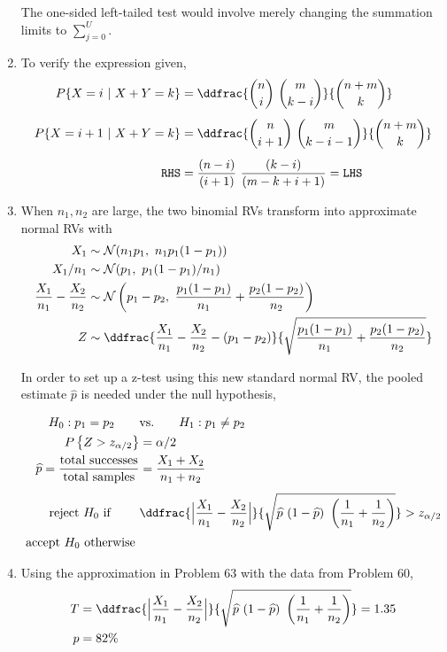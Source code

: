 \begin{enumerate}
	The one-sided left-tailed test would involve merely changing the summation limits to $ \sum\limits_{j = 0}^{U} $.
	
	\item To verify the expression given,
	\begin{align}
		P\{X = i\ |\ X+Y = k\} &= \ddfrac{\binom{n}{i}\ \binom{m}{k-i}}{\binom{n+m}{k}}  \\[1ex]
		P\{X = i+1\ |\ X+Y = k\} &= \ddfrac{\binom{n}{i+1}\ \binom{m}{k-i-1}}{\binom{n+m}{k}} \nonumber \\[1ex]
		\texttt{RHS} &= \frac{(n-i)}{(i+1)} \ \frac{(k-i)}{(m-k+i+1)} = \texttt{LHS}
	\end{align}

	\item When $ n_1, n_2 $ are large, the two binomial RVs transform into approximate normal RVs with
	\begin{align}
		X_1 &\sim \mathcal{N}(n_1 p_1,\ n_1 p_1 (1-p_1)) \nonumber \\
		X_1 / n_1 &\sim \mathcal{N}(p_1,\ p_1 (1-p_1) / n_1) \nonumber \\
		\frac{X_1}{n_1} - \frac{X_2}{n_2} &\sim \mathcal{N}\left( p_1 - p_2,\ \frac{p_1(1-p_1)}{n_1} + \frac{p_2(1-p_2)}{n_2} \right) \\
		Z &\sim \ddfrac{\frac{X_1}{n_1} - \frac{X_2}{n_2} - (p_1 - p_2)}{\sqrt{\frac{p_1(1-p_1)}{n_1} + \frac{p_2(1-p_2)}{n_2}}}
	\end{align}

	In order to set up a z-test using this new standard normal RV, the pooled estimate $ \widehat{p} $ is needed under the null hypothesis,
	
	\begin{align}
		H_0 : p_1 = p_2 \qquad &\text{vs.} \qquad H_1 : p_1  \neq p_2 \nonumber \\
		P \left\{Z > z_{\alpha/2}\right\} &= \alpha/2 \nonumber \\
		\widehat{p} = \frac{\text{total successes}}{\text{total samples}} &= \frac{X_1 + X_2}{n_1 + n_2} \\[1ex]
		\text{reject $ H_0 $ if } \qquad & \ddfrac{\Big|\frac{X_1}{n_1} - \frac{X_2}{n_2}\Big|}{\sqrt{\widehat{p}\ (1 - \widehat{p})\ \left(\frac{1}{n_1} + \frac{1}{n_2}\right)}} > z_{\alpha/2} \nonumber \\
		\text{accept $ H_0 $ otherwise } 
	\end{align}

	\item Using the approximation in Problem 63 with the data from Problem 60,
	\begin{align}
		T &= \ddfrac{\Big|\frac{X_1}{n_1} - \frac{X_2}{n_2}\Big|}{\sqrt{\widehat{p}\ (1 - \widehat{p})\ \left(\frac{1}{n_1} + \frac{1}{n_2}\right)}} = 1.35 \\
		p &= 82\%
	\end{align}
	

\end{enumerate}
